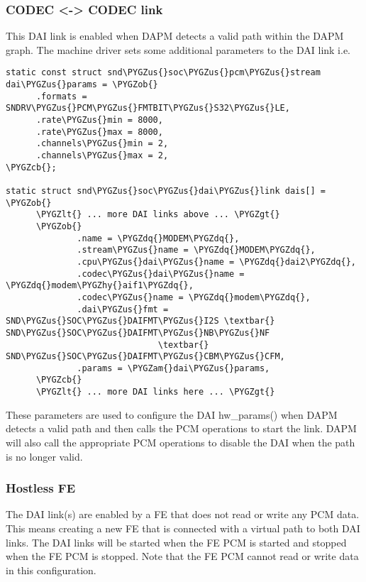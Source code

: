 \documentclass[a4paper,8pt,english]{sphinxmanual}
\def\PYGZus{\char`\_}
\def\PYGZob{\char`\{}
\def\PYGZcb{\char`\}}
\def\PYGZam{\char`\&}
\def\PYGZlt{\char`\<}
\def\PYGZgt{\char`\>}
\def\PYGZhy{\char`\-}
\def\PYGZdq{\char`\"}
\begin{document}
\subsubsection{CODEC \textless{}-\textgreater{} CODEC link}
\label{sound/soc/dpcm:codec-codec-link}
This DAI link is enabled when DAPM detects a valid path within the DAPM graph.
The machine driver sets some additional parameters to the DAI link i.e.

\begin{Verbatim}[commandchars=\\\{\}]
static const struct snd\PYGZus{}soc\PYGZus{}pcm\PYGZus{}stream dai\PYGZus{}params = \PYGZob{}
      .formats = SNDRV\PYGZus{}PCM\PYGZus{}FMTBIT\PYGZus{}S32\PYGZus{}LE,
      .rate\PYGZus{}min = 8000,
      .rate\PYGZus{}max = 8000,
      .channels\PYGZus{}min = 2,
      .channels\PYGZus{}max = 2,
\PYGZcb{};

static struct snd\PYGZus{}soc\PYGZus{}dai\PYGZus{}link dais[] = \PYGZob{}
      \PYGZlt{} ... more DAI links above ... \PYGZgt{}
      \PYGZob{}
              .name = \PYGZdq{}MODEM\PYGZdq{},
              .stream\PYGZus{}name = \PYGZdq{}MODEM\PYGZdq{},
              .cpu\PYGZus{}dai\PYGZus{}name = \PYGZdq{}dai2\PYGZdq{},
              .codec\PYGZus{}dai\PYGZus{}name = \PYGZdq{}modem\PYGZhy{}aif1\PYGZdq{},
              .codec\PYGZus{}name = \PYGZdq{}modem\PYGZdq{},
              .dai\PYGZus{}fmt = SND\PYGZus{}SOC\PYGZus{}DAIFMT\PYGZus{}I2S \textbar{} SND\PYGZus{}SOC\PYGZus{}DAIFMT\PYGZus{}NB\PYGZus{}NF
                              \textbar{} SND\PYGZus{}SOC\PYGZus{}DAIFMT\PYGZus{}CBM\PYGZus{}CFM,
              .params = \PYGZam{}dai\PYGZus{}params,
      \PYGZcb{}
      \PYGZlt{} ... more DAI links here ... \PYGZgt{}
\end{Verbatim}

These parameters are used to configure the DAI hw\_params() when DAPM detects a
valid path and then calls the PCM operations to start the link. DAPM will also
call the appropriate PCM operations to disable the DAI when the path is no
longer valid.


\subsubsection{Hostless FE}
\label{sound/soc/dpcm:hostless-fe}
The DAI link(s) are enabled by a FE that does not read or write any PCM data.
This means creating a new FE that is connected with a virtual path to both
DAI links. The DAI links will be started when the FE PCM is started and stopped
when the FE PCM is stopped. Note that the FE PCM cannot read or write data in
this configuration.
\end{document}
